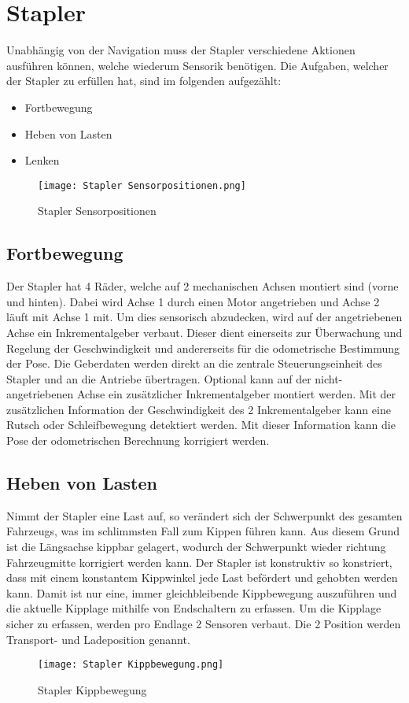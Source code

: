 \chapter{Stapler}
\label{sec: Stapler}

Unabhängig von der Navigation muss der Stapler verschiedene Aktionen ausführen können, welche wiederum Sensorik benötigen. Die Aufgaben, welcher der Stapler zu erfüllen hat, sind im folgenden aufgezählt:
\begin{itemize}
	\item Fortbewegung
	\item Heben von Lasten
	\item Lenken
\end{itemize}	
\begin{figure}[h]
	\centering
	\texttt{[image: Stapler Sensorpositionen.png]}
	\caption{Stapler Sensorpositionen}
	\label{fig: Stapler Sensorpositionen}
\end{figure}

\section{Fortbewegung}\label{sec:Fortbewegung}
Der Stapler hat 4 Räder, welche auf 2 mechanischen Achsen montiert sind (vorne und hinten). Dabei wird Achse 1 durch einen Motor angetrieben und Achse 2 läuft mit Achse 1 mit. Um dies sensorisch abzudecken, wird auf der angetriebenen Achse ein Inkrementalgeber verbaut. Dieser dient einerseits zur Überwachung und Regelung der Geschwindigkeit und andererseits für die odometrische Bestimmung der Pose. Die Geberdaten werden direkt an die zentrale Steuerungseinheit des Stapler und an die Antriebe übertragen. Optional kann auf der nicht-angetriebenen Achse ein zusätzlicher Inkrementalgeber montiert werden. Mit der zusätzlichen Information der Geschwindigkeit des 2 Inkrementalgeber kann eine Rutsch oder Schleifbewegung detektiert werden. Mit dieser Information kann die Pose der odometrischen Berechnung korrigiert werden.

\section{Heben von Lasten}\label{sec:Heben von Lasten}
Nimmt der Stapler eine Last auf, so verändert sich der Schwerpunkt des gesamten Fahrzeugs, was im schlimmsten Fall zum Kippen führen kann. Aus diesem Grund ist die Längsachse kippbar gelagert, wodurch der Schwerpunkt wieder richtung Fahrzeugmitte korrigiert werden kann. Der Stapler ist konstruktiv so konstriert, dass mit einem konstantem Kippwinkel jede Last befördert und gehobten werden kann. Damit ist nur eine, immer gleichbleibende Kippbewegung auszuführen und die aktuelle Kipplage mithilfe von Endschaltern zu erfassen. Um die Kipplage sicher zu erfassen, werden pro Endlage 2 Sensoren verbaut. Die 2 Position werden Transport- und Ladeposition genannt.
\begin{figure}[h]
	\centering
	\texttt{[image: Stapler Kippbewegung.png]}
	\caption{Stapler Kippbewegung}
	\label{fig: Stapler Kippbewegung}
\end{figure}

